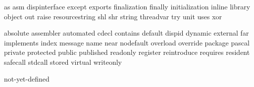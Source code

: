 \useprettyidentifiers \PASidentifiers \PASsetspecials
  as asm dispinterface except exports finalization finally 
  initialization inline library object out raise resourcestring 
  shl shr string threadvar try unit uses xor


\useprettyidentifiers \PASidentifiers \PASsetspecials
  absolute assembler automated cdecl contains default dispid
  dynamic external far implements index message name near 
  nodefault overload override package pascal private protected 
  public published readonly register reintroduce requires 
  resident safecall stdcall stored virtual writeonly  

\useprettyidentifiers \PASvariables \PASsetspecials
  not-yet-defined

\protect \endinput  
